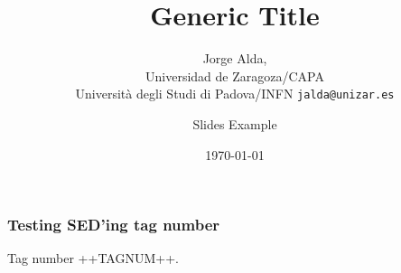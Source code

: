 \documentclass[mathserif, 10pt]{beamer}
\title{Generic Title}
\subtitle{Jorge Alda,\\ Universidad de Zaragoza/CAPA\\
Università degli Studi di Padova/INFN \hspace{4em} \texttt{jalda@unizar.es} }
\author[Jorge Alda]{Slides Example}
\date[Conference]{\today}
\begin{document}
\begin{frame}

\titlepage

\end{frame}


\begin{frame}
\frametitle{Testing SED'ing tag number}
Tag number ++TAGNUM++.
\end{frame}
\end{document}
